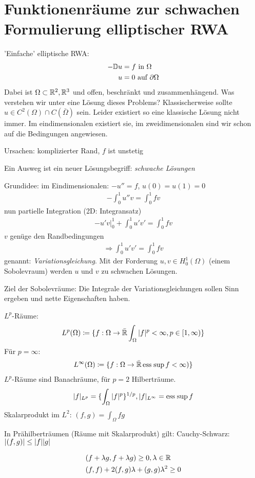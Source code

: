 \section{Funktionenräume zur schwachen Formulierung elliptischer RWA}
'Einfache' elliptische RWA: 
\begin{align*}
- \mathbb{D} u &= f \text{ in } \Omega \\
u &= 0 \text{ auf } \partial \Omega
\end{align*}
Dabei ist $\Omega \subset \mathbb{R}^2, \mathbb{R}^3$ und offen, beschränkt und zusammenhängend. 
Was verstehen wir unter eine Lösung dieses Problems? Klassischerweise sollte $u \in C^2(\Omega) \cap C(\bar \Omega)$ sein. Leider existiert so eine klassische Lösung nicht immer. Im eindimensionalen existiert sie, im zweidimensionalen sind wir schon auf die Bedingungen angewiesen. 

Ursachen: komplizierter Rand, $f$ ist unstetig

Ein Ausweg ist ein neuer Lösungsbegriff: \emph{schwache Lösungen}

Grundidee: im Eindimensionalen: $-u'' = f$, $u(0)= u(1) = 0$
\begin{align*}
  - \int_0^1 u'' v = \int_0^1 f v  
\end{align*}
nun partielle Integration (2D: Integransatz)
\begin{align*}
  \left. - u'v \right|_0^1 + \int_0^1 u'v' = \int_0^1 fv
\end{align*}
$v$ genüge den Randbedingungen
\begin{align*}
  \Rightarrow \int_0^1 u'v' = \int_0^1 fv
\end{align*}
genannt: \emph{Variationsgleichung}. Mit der Forderung $u,v \in H_0^1(\Omega)$ (einem Sobolevraum) werden $u$ und $v$ zu schwachen Lösungen.

Ziel der Sobolevräume: Die Integrale der Variationsgleichungen sollen Sinn ergeben und nette Eigenschaften haben. 

$L^p$-Räume:
\begin{align*}
  L^p(\Omega) \coloneqq \{ f: \Omega\rightarrow \bar {\mathbb{R}} \int_\Omega |f|^p < \infty, p \in[1, \infty) \}
\end{align*}
Für $p = \infty$:
\begin{align*}
  L^\infty(\Omega) \coloneqq \{ f: \Omega\rightarrow \bar {\mathbb{R}} \operatorname{ess\;sup} f <\infty) \}  
\end{align*}
$L^p$-Räume sind Banachräume, für $p = 2$ Hilberträume.
\begin{align*}
  |f|_{L^p}= \{\int_\Omega |f|^p\}^{1/p}, |f|_{L^\infty}= \operatorname{ess\;sup} f
\end{align*}
Skalarprodukt im $L^2$: $(f,g) = \int_\Omega fg$
\begin{lemma}
In Prähilberträumen (Räume mit Skalarprodukt) gilt: 
Cauchy-Schwarz: $|(f,g)| \leq |f| |g|$
\end{lemma}
\begin{beweis}
  \begin{align*}
    &(f + \lambda g, f + \lambda g) \geq 0, \lambda \in \mathbb{R}\\
&(f, f) + 2(f,g)\lambda+ (g,g)\lambda^2 \geq 0
  \end{align*}
\end{beweis}

